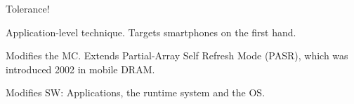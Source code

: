 Tolerance!\cite{flikker}

Application-level technique.
Targets smartphones on the first hand.

Modifies the MC.
Extends Partial-Array Self Refresh Mode (PASR), which was introduced 2002 in mobile DRAM. 

Modifies SW: Applications, the runtime system and the OS.


